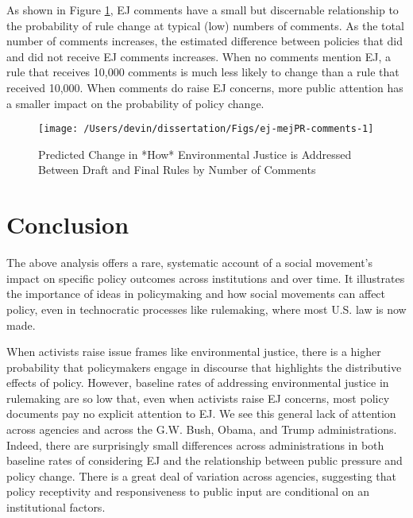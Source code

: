 \documentclass[
      12pt,
        ]{article}
\begin{document}
As shown in Figure \ref{fig:ej-mejPR-comments}, EJ comments have a small but discernable relationship to the probability of rule change at typical (low) numbers of comments. As the total number of comments increases, the estimated difference between policies that did and did not receive EJ comments increases. When no comments mention EJ, a rule that receives 10,000 comments is much less likely to change than a rule that received 10,000. When comments do raise EJ concerns, more public attention has a smaller impact on the probability of policy change.

\begin{figure}

{\centering \texttt{[image: /Users/devin/dissertation/Figs/ej-mejPR-comments-1]} 

}

\caption{Predicted Change in *How* Environmental Justice is Addressed Between Draft and Final Rules by Number of Comments}\label{fig:ej-mejPR-comments}
\end{figure}

\hypertarget{conclusion}{%
\section{Conclusion}\label{conclusion}}

The above analysis offers a rare, systematic account of a social movement's impact on specific policy outcomes across institutions and over time. It illustrates the importance of ideas in policymaking and how social movements can affect policy, even in technocratic processes like rulemaking, where most U.S. law is now made.

When activists raise issue frames
like environmental justice, there is a higher probability that
policymakers engage in discourse that highlights the distributive effects of policy. However, baseline rates of addressing environmental justice in rulemaking are so low that, even when activists raise EJ concerns, most policy documents pay no explicit attention to EJ. We see this general lack of attention across agencies and across the G.W. Bush, Obama, and Trump administrations. Indeed, there are surprisingly small differences across administrations in both baseline rates of considering EJ and the relationship between public pressure and policy change.
There is a great deal of variation across agencies, suggesting that policy receptivity and responsiveness to public input are conditional on an
institutional factors.
\end{document}
